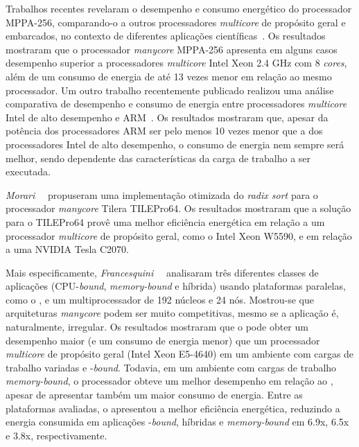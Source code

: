 Trabalhos recentes revelaram o desempenho e consumo energético do processador
MPPA-256, comparando-o a outros processadores \textit{multicore} de propósito
geral e embarcados, no contexto de diferentes aplicações
científicas~\cite{Castro-SBAC-PAD:2014,Castro-IA3:2013,Castro-IA3-JPDC:2014}. Os
resultados mostraram que o processador \emph{manycore} MPPA-256 apresenta em
alguns casos desempenho superior a processadores \emph{multicore} Intel Xeon 2.4
GHz com 8 \emph{cores}, além de um consumo de energia de até 13 vezes menor em
relação ao mesmo processador. Um outro trabalho recentemente publicado realizou
uma análise comparativa de desempenho e consumo de energia entre processadores
\emph{multicore} Intel de alto desempenho e ARM~\cite{Castro-Padoin-IET:2015}.
Os resultados mostraram que, apesar da potência dos processadores ARM ser pelo
menos 10 vezes menor que a dos processadores Intel de alto desempenho, o consumo
de energia nem sempre será melhor, sendo dependente das características da carga
de trabalho a ser executada.

\emph{Morari}~\etal~\cite{Valero:2012} propuseram uma implementação otimizada do
\textit{radix sort} para o processador \textit{manycore} Tilera TILEPro64. Os
resultados mostraram que a solução para o TILEPro64 provê uma melhor eficiência
energética em relação a um processador \textit{multicore} de propósito geral, como
o Intel Xeon W5590, e em relação a uma \gpu NVIDIA Tesla C2070.

Mais especificamente, \emph{Francesquini}~\etal~\cite{Castro-IA3-JPDC:2014} analisaram
três diferentes classes de aplicações (CPU-\textit{bound}, \textit{memory-bound}
e híbrida) usando plataformas paralelas, como o \mppa, e um multiprocessador \numa de
192 núcleos e 24 nós. Mostrou-se que arquiteturas \textit{manycore} podem ser muito
competitivas, mesmo se a aplicação é, naturalmente, irregular. Os resultados mostraram
que o \mppa pode obter um desempenho maior (e um consumo de energia menor) que um
processador \textit{multicore} de propósito geral (Intel Xeon E5-4640) em um ambiente
com cargas de trabalho variadas e \cpu{}-\textit{bound}. Todavia, em um ambiente com cargas
de trabalho \textit{memory-bound}, o processador \numa obteve um melhor desempenho
em relação ao \mppa, apesar de apresentar também um maior consumo de energia.
Entre as plataformas avaliadas, o \mppa apresentou a melhor eficiência
energética, reduzindo a energia consumida em aplicações \cpu{}-\textit{bound},
híbridas e \textit{memory-bound} em 6.9x, 6.5x e 3.8x, respectivamente.

